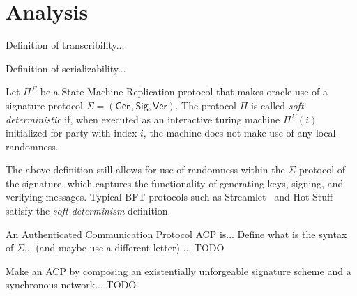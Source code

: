 \section{Analysis}

\begin{definition}[Transcribability]
      Definition of transcribility...
\end{definition}

\begin{definition}[Serializability]
      Definition of serializability...
\end{definition}

\begin{definition}
      Let $\Pi^\Sigma$ be a State Machine Replication protocol that makes
      oracle use of a signature protocol $\Sigma = (\textsf{Gen}, \textsf{Sig}, \textsf{Ver})$.
      The protocol $\Pi$ is called \emph{soft deterministic} if,
      when executed as an interactive turing machine $\Pi^\Sigma(i)$ initialized for party
      with index $i$, the machine does not make use of any local randomness.
\end{definition}

The above definition still allows for use of randomness within the $\Sigma$ protocol of the
signature, which captures the functionality of generating keys, signing, and verifying
messages. Typical BFT protocols such as Streamlet~\cite{streamlet} and Hot Stuff~\cite{hot-stuff}
satisfy the \emph{soft determinism} definition.

\begin{definition}
      An Authenticated Communication Protocol ACP is...
      Define what is the syntax of $\Sigma$... (and maybe use a different letter)
      ... TODO
\end{definition}

\begin{definition}
      Make an ACP by composing an existentially unforgeable signature scheme and
      a synchronous network... TODO
\end{definition}

